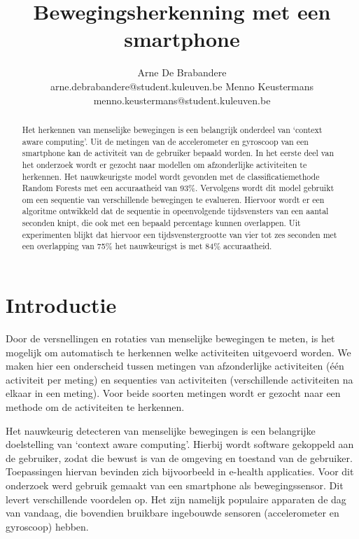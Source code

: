 \documentclass{article}
\title{Bewegingsherkenning met een smartphone}
\author{Arne De Brabandere\\
	arne.debrabandere@student.kuleuven.be
    \And
    Menno Keustermans\\
    menno.keustermans@student.kuleuven.be}
\begin{document}
\maketitle
\raggedbottom
\begin{abstract}

Het herkennen van menselijke bewegingen is een belangrijk onderdeel van `context aware computing'. Uit de metingen van de accelerometer en gyroscoop van een smartphone kan de activiteit van de gebruiker bepaald worden. In het eerste deel van het onderzoek wordt er gezocht naar modellen om afzonderlijke activiteiten te herkennen. Het nauwkeurigste model wordt gevonden met de classificatiemethode Random Forests met een accuraatheid van 93\%. Vervolgens wordt dit model gebruikt om een sequentie van verschillende bewegingen te evalueren. Hiervoor wordt er een algoritme ontwikkeld dat de sequentie in opeenvolgende tijdsvensters van een aantal seconden knipt, die ook met een bepaald percentage kunnen overlappen. Uit experimenten blijkt dat hiervoor een tijdsvenstergrootte van vier tot zes seconden met een overlapping van 75\% het nauwkeurigst is met 84\% accuraatheid.

\end{abstract}

\section{Introductie}

Door de versnellingen en rotaties van menselijke bewegingen te meten, is het mogelijk om automatisch te herkennen welke activiteiten uitgevoerd worden. We maken hier een onderscheid tussen metingen van afzonderlijke activiteiten (\'e\'en activiteit per meting) en sequenties van activiteiten (verschillende activiteiten na elkaar in een meting). Voor beide soorten metingen wordt er gezocht naar een methode om de activiteiten te herkennen.

Het nauwkeurig detecteren van menselijke bewegingen is een belangrijke doelstelling van `context aware computing'. Hierbij wordt software gekoppeld aan de gebruiker, zodat die bewust is van de omgeving en toestand van de gebruiker. Toepassingen hiervan bevinden zich bijvoorbeeld in e-health applicaties. Voor dit onderzoek werd gebruik gemaakt van een smartphone als bewegingssensor. Dit levert verschillende voordelen op. Het zijn namelijk populaire apparaten de dag van vandaag, die bovendien bruikbare ingebouwde sensoren (accelerometer en gyroscoop) hebben.
\end{document}
